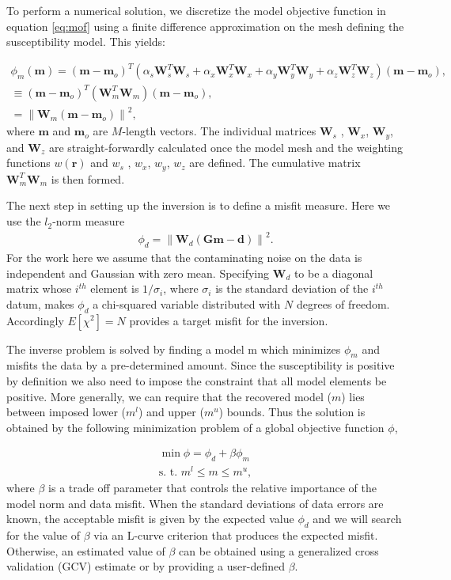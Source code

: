 To perform a numerical solution, we discretize the model objective function in equation \ref{eq:mof} using a finite difference approximation on the mesh defining the susceptibility model. This yields:

\begin{eqnarray}
\label{eq:modobjdiscr}
\phi_m(\mathbf{m}) = (\mathbf{m}-\mathbf{m}_o)^T(\alpha_s \mathbf{W}_s^T\mathbf{W}_s+\alpha_x \mathbf{W}_x^T\mathbf{W}_x+\alpha_y \mathbf{W}_y^T\mathbf{W}_y+\alpha_z \mathbf{W}_z^T\mathbf{W}_z)(\mathbf{m}-\mathbf{m}_o), \nonumber\\
\equiv(\mathbf{m}-\mathbf{m}_o)^T(\mathbf{W}_m^T\mathbf{W}_m)(\mathbf{m}-\mathbf{m}_o), \nonumber\\
=\left \| \mathbf{W}_m(\mathbf{m}-\mathbf{m}_o) \right \|^2,
\end{eqnarray}
where $\mathbf{m}$ and $\mathbf{m}_o$ are $M$-length vectors. The individual matrices $\mathbf{W}_s$ , $\mathbf{W}_x$, $\mathbf{W}_y$, and $\mathbf{W}_z$ are straight-forwardly calculated once the model mesh and the weighting functions $w(\mathbf{r})$ and $w_s$ , $w_x$, $w_y$, $w_z$ are defined. The cumulative matrix $\mathbf{W}_m^T\mathbf{W}_m$ is then formed.

The next step in setting up the inversion is to define a misfit measure. Here we use the $l_2$-norm measure
\begin{eqnarray}
\label{eq:phid}
\phi_d = \left\| \mathbf{W}_d(\mathbf{G}\mathbf{m}-\mathbf{d})\right\|^2.
\end{eqnarray}
%
For the work here we assume that the contaminating noise on the data is independent and Gaussian with zero mean. Specifying $\mathbf{W}_d$ to be a diagonal matrix whose $i^{th}$ element is $1/\sigma_i$, where $\sigma_i$ is the standard deviation of the $i^{th}$ datum, makes $\phi_d$ a chi-squared variable distributed with $N$ degrees of freedom. Accordingly $E[\chi^2]=N$ provides a target misfit for the inversion.

The inverse problem is solved by finding a model m which minimizes $\phi_m$ and misfits the data by a pre-determined amount. Since the susceptibility is positive by definition we also need to impose the constraint that all model elements be positive. More generally, we can require that the recovered model ($m$) lies between imposed lower ($m^l$) and upper ($m^u$) bounds. Thus the solution is obtained by the following minimization problem of a global objective function $\phi$,

\begin{eqnarray}
\label{eq:globphi}
\min \phi = \phi_d+\beta\phi_m \\
\mbox{s. t. } m^l\leq m\leq m^u, \nonumber
\end{eqnarray}
%
where $\beta$ is a trade off parameter that controls the relative importance of the model norm and data misfit. When the standard deviations of data errors are known, the acceptable misfit is given by the expected value $\phi_d$ and we will search for the value of $\beta$ via an L-curve criterion \cite[]{Hansen00} that produces the expected misfit. Otherwise, an estimated value of $\beta$ can be obtained using a generalized cross validation (GCV) estimate \cite[]{GolubHeath79} or by providing a user-defined $\beta$.

